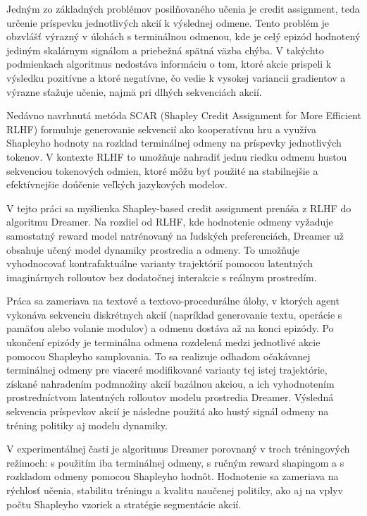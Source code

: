 Jedným zo základných problémov posilňovaného učenia je credit assignment, teda určenie príspevku jednotlivých akcií k výslednej odmene. Tento problém je obzvlášť výrazný v úlohách s terminálnou odmenou, kde je celý epizód hodnotený jediným skalárnym signálom a priebežná spätná väzba chýba. V takýchto podmienkach algoritmus nedostáva informáciu o tom, ktoré akcie prispeli k výsledku pozitívne a ktoré negatívne, čo vedie k vysokej variancii gradientov a výrazne sťažuje učenie, najmä pri dlhých sekvenciách akcií.

Nedávno navrhnutá metóda SCAR (Shapley Credit Assignment for More Efficient RLHF) formuluje generovanie sekvencií ako kooperatívnu hru a využíva Shapleyho hodnoty na rozklad terminálnej odmeny na príspevky jednotlivých tokenov. V kontexte RLHF to umožňuje nahradiť jednu riedku odmenu hustou sekvenciou tokenových odmien, ktoré môžu byť použité na stabilnejšie a efektívnejšie doúčenie veľkých jazykových modelov.

V tejto práci sa myšlienka Shapley-based credit assignment prenáša z RLHF do algoritmu Dreamer. Na rozdiel od RLHF, kde hodnotenie odmeny vyžaduje samostatný reward model natrénovaný na ľudských preferenciách, Dreamer už obsahuje učený model dynamiky prostredia a odmeny. To umožňuje vyhodnocovať kontrafaktuálne varianty trajektórií pomocou latentných imaginárnych rolloutov bez dodatočnej interakcie s reálnym prostredím.

Práca sa zameriava na textové a textovo-procedurálne úlohy, v ktorých agent vykonáva sekvenciu diskrétnych akcií (napríklad generovanie textu, operácie s pamäťou alebo volanie modulov) a odmenu dostáva až na konci epizódy. Po ukončení epizódy je terminálna odmena rozdelená medzi jednotlivé akcie pomocou Shapleyho samplovania. To sa realizuje odhadom očakávanej terminálnej odmeny pre viaceré modifikované varianty tej istej trajektórie, získané nahradením podmnožiny akcií bazálnou akciou, a ich vyhodnotením prostredníctvom latentných rolloutov modelu prostredia Dreamer. Výsledná sekvencia príspevkov akcií je následne použitá ako hustý signál odmeny na tréning politiky aj modelu dynamiky.

V experimentálnej časti je algoritmus Dreamer porovnaný v troch tréningových režimoch: s použitím iba terminálnej odmeny, s ručným reward shapingom a s rozkladom odmeny pomocou Shapleyho hodnôt. Hodnotenie sa zameriava na rýchlosť učenia, stabilitu tréningu a kvalitu naučenej politiky, ako aj na vplyv počtu Shapleyho vzoriek a stratégie segmentácie akcií.